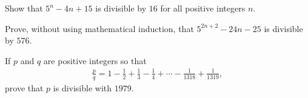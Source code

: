 \documentclass{subfile}
\begin{document}
%

	\begin{problem}
		Show that $5^{n} -4n+15$ is divisible by $16$ for all positive integers $n$.
	\end{problem}


	\begin{problem}
		Prove, without using mathematical induction, that  $5^{2n+2} -24 n -25$ is divisible by $576$.
	\end{problem}


	\begin{problem}
		If $p$ and $q$ are positive integers so that
			\begin{align*}
				\frac{p}{q}=1-\frac{1}{2}+\frac{1}{3}-\frac{1}{4}+ \cdots -\frac{1}{1318}+\frac{1}{1319},
			\end{align*}
		prove that $p$ is divisible with $1979$. %
	\end{problem}
\end{document}
